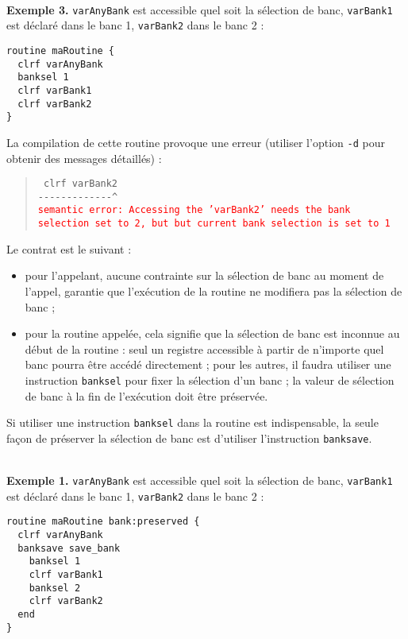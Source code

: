 ~\\
\textbf{Exemple 3.} \texttt{varAnyBank} est accessible quel soit la sélection de banc, \texttt{varBank1} est déclaré dans le banc 1, \texttt{varBank2} dans le banc 2 :
\begin{lstlisting}[language=piccolo]
routine maRoutine {
  clrf varAnyBank
  banksel 1
  clrf varBank1
  clrf varBank2
}
\end{lstlisting}

La compilation de cette routine provoque une erreur (utiliser l’option \texttt{-d} pour obtenir des messages détaillés) :

\begin{quote}
\texttt{  clrf varBank2}\\
\texttt{-{-}-{-}-{-}-{-}-{-}-{-}-\^}\\
\textcolor{red}{\tt semantic error: Accessing the 'varBank2' needs the bank selection set to 2, but but current bank selection is set to 1}
\end{quote}














Le contrat est le suivant :
\begin{itemize}
  \item pour l'appelant, aucune contrainte sur la sélection de banc au moment de l'appel, garantie que l'exécution de la routine ne modifiera pas la sélection de banc ; 
\item pour la routine appelée, cela signifie que la sélection de banc est inconnue au début de la routine : seul un registre accessible à partir de n'importe quel banc pourra être accédé directement ; pour les autres, il faudra utiliser une instruction \texttt{banksel} pour fixer la sélection d'un banc ; la valeur de sélection de banc à la fin de l'exécution doit être préservée.
\end{itemize}

Si utiliser une instruction \texttt{banksel} dans la routine est indispensable, la seule façon de préserver la sélection de banc est d'utiliser l'instruction \texttt{banksave}. 

~\\
\textbf{Exemple 1.} \texttt{varAnyBank} est accessible quel soit la sélection de banc, \texttt{varBank1} est déclaré dans le banc 1, \texttt{varBank2} dans le banc 2 :
\begin{lstlisting}[language=piccolo]
routine maRoutine bank:preserved {
  clrf varAnyBank
  banksave save_bank
    banksel 1
    clrf varBank1
    banksel 2
    clrf varBank2
  end
}
\end{lstlisting}

